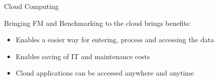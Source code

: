 \begin{frame}{Cloud Computing}
	\begin{block}{Bringing FM and Benchmarking to the cloud brings benefits:}
		\begin{itemize}
			\item Enables a easier way for entering, process and accessing the data
		\end{itemize}
		\begin{itemize}
			\item Enables saving of IT and maintenance costs 
		\end{itemize}
		\begin{itemize}
			\item Cloud applications can be accessed anywhere and anytime
		\end{itemize}
	\end{block}
\end{frame}

